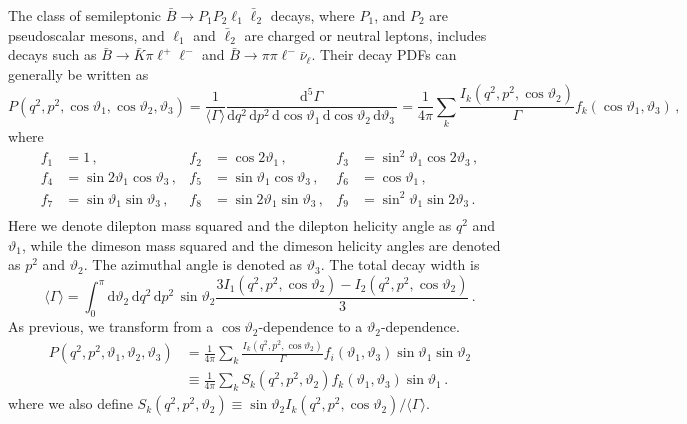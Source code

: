 \documentclass[aps,prd,reprint,nofootinbib,preprintnumbers]{revtex4}
\newcommand{\rmdx}[1]{\mbox{d} #1 \,} %
\renewcommand{\theta}{\vartheta}
\begin{document}
The class of semileptonic $\bar{B}\to P_1 P_2 \ell_1\bar\ell_2$ decays, where $P_1$, and $P_2$ are pseudoscalar mesons,
and $\ell_1$ and $\bar\ell_2$ are charged or neutral leptons, includes decays
such as $\bar{B}\to\bar{K}\pi\ell^+\ell^-$ and $\bar{B}\to \pi\pi\ell^-\bar\nu_\ell$.
Their decay PDFs can generally be written as \cite{Lee:1992ih}
\begin{equation}
    P(q^2, p^2, \cos\theta_1, \cos \theta_2, \theta_3) = \frac{1}{\langle \Gamma\rangle}\frac{\rmdx{^5 \Gamma}}{\rmdx{q^2} \rmdx{p^2} \rmdx{\cos\theta_1} \rmdx{\cos\theta_2} \rmdx{\theta_3}} = \frac{1}{4\pi} \sum_k \frac{I_k(q^2, p^2, \cos\theta_2)}{\Gamma} f_k(\cos\theta_1,\theta_3)\,,
\end{equation}
where
\begin{equation}
\begin{aligned}
    f_1 & = 1\,,              &
    f_2 & = \cos 2\theta_1\,, &
    f_3 & = \sin^2\theta_1 \cos 2\theta_3\,,\\
    f_4 & = \sin 2\theta_1 \cos  \theta_3\,,&
    f_5 & = \sin  \theta_1 \cos  \theta_3\,,&
    f_6 & = \cos  \theta_1\,, \\
    f_7 & = \sin  \theta_1 \sin  \theta_3\,,&
    f_8 & = \sin 2\theta_1 \sin  \theta_3\,,&
    f_9 & = \sin^2\theta_1 \sin 2\theta_3\,.\\
\end{aligned}
\end{equation}
Here we denote dilepton mass squared and the dilepton helicity angle as $q^2$ and $\theta_1$, while
the dimeson mass squared and the dimeson helicity angles are denoted as $p^2$ and $\theta_2$. The
azimuthal angle is denoted as $\theta_3$.
The total decay width is
\begin{equation}
    \langle \Gamma\rangle = \int_0^\pi \rmdx{\theta_2} \rmdx{q^2} \rmdx{p^2} \sin\theta_2 \frac{3I_1(q^2, p^2, \cos\theta_2) - I_2(q^2, p^2, \cos\theta_2)}{3}\,.
\end{equation}
As previous, we transform from a $\cos\theta_2$-dependence to a $\theta_2$-dependence.
\begin{equation}
\begin{aligned}
    P(q^2, p^2, \theta_1, \theta_2, \theta_3)
    & = \frac{1}{4\pi} \sum_k \frac{I_k(q^2, p^2, \cos\theta_2)}{\Gamma} f_i(\theta_1, \theta_3) \sin\theta_1 \sin\theta_2\\
    & \equiv \frac{1}{4\pi} \sum_k S_k(q^2, p^2, \theta_2) f_k(\theta_1, \theta_3) \sin\theta_1\,.
\end{aligned}
\end{equation}
where we also define $S_k(q^2, p^2, \theta_2) \equiv \sin\theta_2 I_k(q^2, p^2, \cos\theta_2) / \langle \Gamma\rangle$.\\
\end{document}
